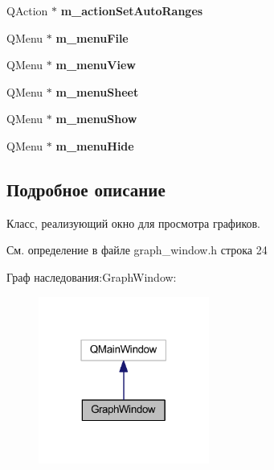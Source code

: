 \begin{DoxyCompactItemize}
\item 
\hypertarget{class_graph_window_add86d9623399b3aaace9c961c2c56d9f}{}\label{class_graph_window_add86d9623399b3aaace9c961c2c56d9f} 
Q\+Action $\ast$ {\bfseries m\+\_\+action\+Set\+Auto\+Ranges}
\item 
\hypertarget{class_graph_window_a2cfe856a0c10dfffb05e4a568d135feb}{}\label{class_graph_window_a2cfe856a0c10dfffb05e4a568d135feb} 
Q\+Menu $\ast$ {\bfseries m\+\_\+menu\+File}
\item 
\hypertarget{class_graph_window_a3e2ffe57452e156a0d62fb82da8ed868}{}\label{class_graph_window_a3e2ffe57452e156a0d62fb82da8ed868} 
Q\+Menu $\ast$ {\bfseries m\+\_\+menu\+View}
\item 
\hypertarget{class_graph_window_ae3c17a4c2fc6e3f935dc3b3f7cc89974}{}\label{class_graph_window_ae3c17a4c2fc6e3f935dc3b3f7cc89974} 
Q\+Menu $\ast$ {\bfseries m\+\_\+menu\+Sheet}
\item 
\hypertarget{class_graph_window_a4078c2f892ffb57912412fb0c38af5ba}{}\label{class_graph_window_a4078c2f892ffb57912412fb0c38af5ba} 
Q\+Menu $\ast$ {\bfseries m\+\_\+menu\+Show}
\item 
\hypertarget{class_graph_window_a2df057f6b70c12d9190a456a7f62b9c4}{}\label{class_graph_window_a2df057f6b70c12d9190a456a7f62b9c4} 
Q\+Menu $\ast$ {\bfseries m\+\_\+menu\+Hide}
\end{DoxyCompactItemize}


\subsection{Подробное описание}
Класс, реализующий окно для просмотра графиков. 

См. определение в файле graph\+\_\+window.\+h строка 24



Граф наследования\+:Graph\+Window\+:\nopagebreak
\begin{figure}[H]
\begin{center}
\leavevmode
\includegraphics[width=159pt]{class_graph_window__inherit__graph}
\end{center}
\end{figure}


